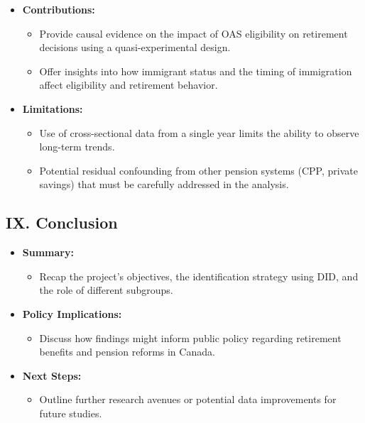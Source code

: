 \documentclass[
]{article}
\providecommand{\tightlist}{%
  \setlength{\itemsep}{0pt}\setlength{\parskip}{0pt}}
\begin{document}
\begin{itemize}
\tightlist
\item
  \textbf{Contributions:}

  \begin{itemize}
  \tightlist
  \item
    Provide causal evidence on the impact of OAS eligibility on
    retirement decisions using a quasi-experimental design.
  \item
    Offer insights into how immigrant status and the timing of
    immigration affect eligibility and retirement behavior.
  \end{itemize}
\item
  \textbf{Limitations:}

  \begin{itemize}
  \tightlist
  \item
    Use of cross-sectional data from a single year limits the ability to
    observe long-term trends.
  \item
    Potential residual confounding from other pension systems (CPP,
    private savings) that must be carefully addressed in the analysis.
  \end{itemize}
\end{itemize}

\subsection{IX. Conclusion}\label{ix.-conclusion}

\begin{itemize}
\tightlist
\item
  \textbf{Summary:}

  \begin{itemize}
  \tightlist
  \item
    Recap the project's objectives, the identification strategy using
    DID, and the role of different subgroups.
  \end{itemize}
\item
  \textbf{Policy Implications:}

  \begin{itemize}
  \tightlist
  \item
    Discuss how findings might inform public policy regarding retirement
    benefits and pension reforms in Canada.
  \end{itemize}
\item
  \textbf{Next Steps:}

  \begin{itemize}
  \tightlist
  \item
    Outline further research avenues or potential data improvements for
    future studies.
  \end{itemize}
\end{itemize}
\end{document}
